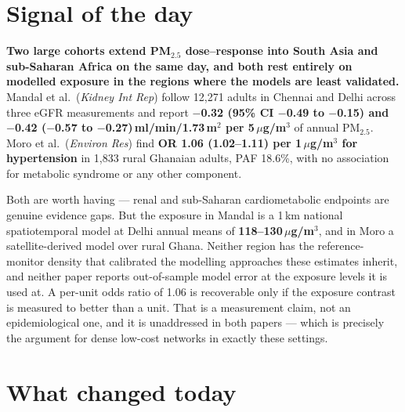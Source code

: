 \documentclass[10pt]{article}
\begin{document}
\vspace{6mm}

\section*{\sffamily\bfseries\color{Deep}Signal of the day}
\vspace{-1.5mm}{\color{Amber}\rule{\linewidth}{1.1pt}}\vspace{2.5mm}

\begin{keybox}
{\sffamily\bfseries\small\color{Deep}Two large cohorts extend PM$_{2.5}$ dose--response
into South Asia and sub-Saharan Africa on the same day, and both rest entirely on modelled
exposure in the regions where the models are least validated.}\\[1.4mm]
\footnotesize
Mandal et al.\ (\textit{Kidney Int Rep}) follow 12{,}271 adults in Chennai and Delhi across
three eGFR measurements and report \textbf{$-$0.32 (95\% CI $-$0.49 to $-$0.15) and
$-$0.42 ($-$0.57 to $-$0.27)\,ml/min/1.73\,m$^2$ per 5\,$\mu$g/m$^3$} of annual PM$_{2.5}$.
Moro et al.\ (\textit{Environ Res}) find \textbf{OR 1.06 (1.02--1.11) per
1\,$\mu$g/m$^3$ for hypertension} in 1{,}833 rural Ghanaian adults, PAF 18.6\%, with no
association for metabolic syndrome or any other component.

Both are worth having --- renal and sub-Saharan cardiometabolic endpoints are genuine
evidence gaps. But the exposure in Mandal is a 1\,km national spatiotemporal model at
Delhi annual means of \textbf{118--130\,$\mu$g/m$^3$}, and in Moro a satellite-derived
model over rural Ghana. Neither region has the reference-monitor density that calibrated
the modelling approaches these estimates inherit, and neither paper reports out-of-sample
model error at the exposure levels it is used at. A per-unit odds ratio of 1.06 is
recoverable only if the exposure contrast is measured to better than a unit. That is a
measurement claim, not an epidemiological one, and it is unaddressed in both papers ---
which is precisely the argument for dense low-cost networks in exactly these settings.
\end{keybox}

\vspace{3mm}

\section*{\sffamily\bfseries\color{Deep}What changed today}
\vspace{-1.5mm}{\color{Amber}\rule{\linewidth}{1.1pt}}\vspace{2.5mm}
\end{document}
